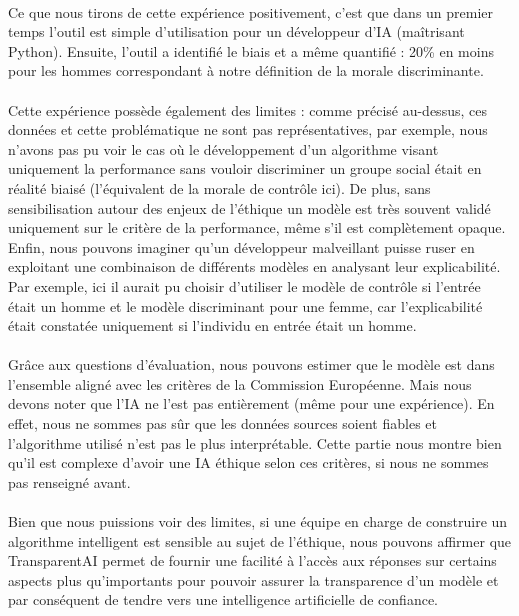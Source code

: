 \documentclass[10pt, french, a4paper]{report}
\begin{document}
\paragraph{}
Ce que nous tirons de cette expérience positivement, c'est que dans un premier temps l'outil est simple d'utilisation pour un développeur d'IA (maîtrisant Python). Ensuite, l'outil a identifié le biais et a même quantifié : 20\% en moins pour les hommes correspondant à notre définition de la morale discriminante.

\paragraph{}
Cette expérience possède également des limites : comme précisé au-dessus, ces données et cette problématique ne sont pas représentatives, par exemple, nous n'avons pas pu voir le cas où le développement d'un algorithme visant uniquement la performance sans vouloir discriminer un groupe social était en réalité biaisé (l'équivalent de la morale de contrôle ici). De plus, sans sensibilisation autour des enjeux de l'éthique un modèle est très souvent validé uniquement sur le critère de la performance, même s'il est complètement opaque. Enfin, nous pouvons imaginer qu'un développeur malveillant puisse ruser en exploitant une combinaison de différents modèles en analysant leur explicabilité. Par exemple, ici il aurait pu choisir d'utiliser le modèle de contrôle si l'entrée était un homme et le modèle discriminant pour une femme, car l'explicabilité était constatée uniquement si l'individu en entrée était un homme. 

\paragraph{}
Grâce aux questions d'évaluation, nous pouvons estimer que le modèle est dans l'ensemble aligné avec les critères de la Commission Européenne. Mais nous devons noter que l'IA ne l'est pas entièrement (même pour une expérience). En effet, nous ne sommes pas sûr que les données sources soient fiables et l'algorithme utilisé n'est pas le plus interprétable. Cette partie nous montre bien qu'il est complexe d'avoir une IA éthique selon ces critères, si nous ne sommes pas renseigné avant.

\paragraph{}
Bien que nous puissions voir des limites, si une équipe en charge de construire un algorithme intelligent est sensible au sujet de l'éthique, nous pouvons affirmer que TransparentAI permet de fournir une facilité à l'accès aux réponses sur certains aspects plus qu'importants pour pouvoir assurer la transparence d'un modèle et par conséquent de tendre vers une intelligence artificielle de confiance.
\end{document}
